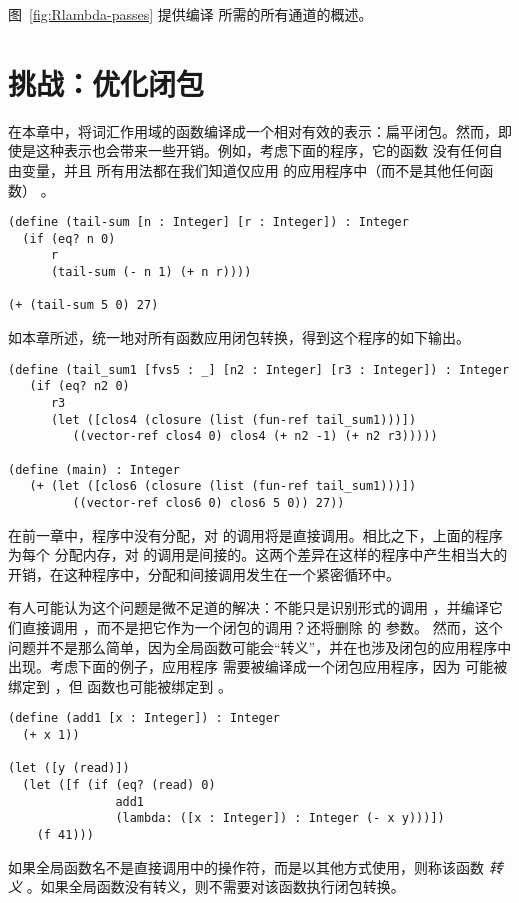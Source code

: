 \documentclass[11pt]{book}
\begin{document}
图~\ref{fig:Rlambda-passes} 提供编译 \LangLam{} 所需的所有通道的概述。

\clearpage

\section{挑战：优化闭包}
\label{sec:optimize-closures}

在本章中，将词汇作用域的函数编译成一个相对有效的表示：扁平闭包。然而，即使是这种表示也会带来一些开销。例如，考虑下面的程序，它的函数  没有任何自由变量，并且  所有用法都在我们知道仅应用  的应用程序中（而不是其他任何函数） 。
\begin{center}
\begin{minipage}{0.95\textwidth}
\begin{lstlisting}
(define (tail-sum [n : Integer] [r : Integer]) : Integer
  (if (eq? n 0)
      r
      (tail-sum (- n 1) (+ n r))))

(+ (tail-sum 5 0) 27)
\end{lstlisting}
\end{minipage}
\end{center}
如本章所述，统一地对所有函数应用闭包转换，得到这个程序的如下输出。
\begin{center}
\begin{minipage}{0.95\textwidth}
\begin{lstlisting}
(define (tail_sum1 [fvs5 : _] [n2 : Integer] [r3 : Integer]) : Integer
   (if (eq? n2 0)
      r3
      (let ([clos4 (closure (list (fun-ref tail_sum1)))])
         ((vector-ref clos4 0) clos4 (+ n2 -1) (+ n2 r3)))))

(define (main) : Integer
   (+ (let ([clos6 (closure (list (fun-ref tail_sum1)))])
         ((vector-ref clos6 0) clos6 5 0)) 27))
\end{lstlisting}
\end{minipage}
\end{center}

在前一章中，程序中没有分配，对 的调用将是直接调用。相比之下，上面的程序为每个  分配内存，对  的调用是间接的。这两个差异在这样的程序中产生相当大的开销，在这种程序中，分配和间接调用发生在一个紧密循环中。

有人可能认为这个问题是微不足道的解决：不能只是识别形式的调用 
，并编译它们直接调用  ，而不是把它作为一个闭包的调用？还将删除  的  参数。
%
然而，这个问题并不是那么简单，因为全局函数可能会“转义”，并在也涉及闭包的应用程序中出现。考虑下面的例子，应用程序
 需要被编译成一个闭包应用程序，因为  可能被绑定到  ，但 
函数也可能被绑定到  。
\begin{lstlisting}
(define (add1 [x : Integer]) : Integer
  (+ x 1))

(let ([y (read)])
  (let ([f (if (eq? (read) 0)
               add1
               (lambda: ([x : Integer]) : Integer (- x y)))])
    (f 41)))
\end{lstlisting}
如果全局函数名不是直接调用中的操作符，而是以其他方式使用，则称该函数
\emph{转义} 。如果全局函数没有转义，则不需要对该函数执行闭包转换。
\end{document}
